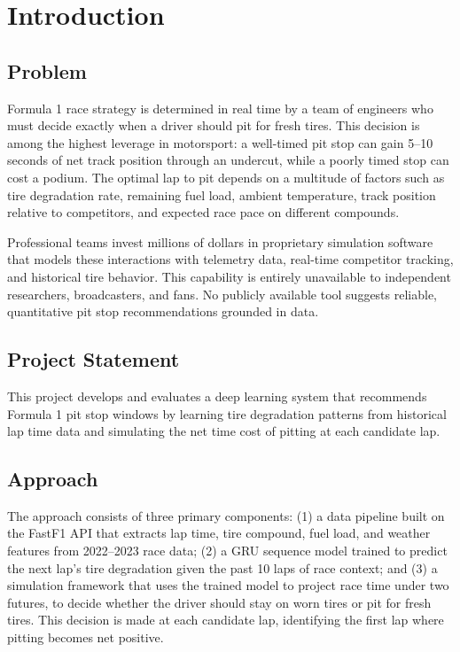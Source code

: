 \section{Introduction}

\subsection{Problem}

Formula 1 race strategy is determined in real time by a team of engineers who must decide exactly when a driver 
should pit for fresh tires. This decision is among the highest leverage in motorsport: a well-timed pit stop can gain 5--10 
seconds of net track position through an undercut, while a poorly timed stop can cost a podium. The optimal lap to pit depends on a 
multitude of factors such as tire degradation rate, remaining fuel load, ambient temperature, track position relative to competitors,
and expected race pace on different compounds.

Professional teams invest millions of dollars in proprietary simulation software that models these interactions with telemetry 
data, real-time competitor tracking, and historical tire behavior. This capability is entirely unavailable to independent researchers,
 broadcasters, and fans. No publicly available tool suggests reliable, quantitative pit stop recommendations grounded in data.

\subsection{Project Statement}

 This project develops and evaluates a deep learning system that recommends Formula 1 pit stop windows by learning tire degradation 
patterns from historical lap time data and simulating the net time cost of pitting at each candidate lap.

\subsection{Approach}

The approach consists of three primary components: (1) a data pipeline built on the FastF1 API \cite{fastf1} that extracts lap time, tire compound, fuel load, 
and weather features from 2022--2023 race data; (2) a GRU sequence model \cite{cho2014} trained to predict the next lap's tire degradation given the 
past 10 laps of race context; and (3) a simulation framework that uses the trained model to project race time under two futures, to decide whether the driver should stay on worn tires 
or pit for fresh tires. This decision is made at each candidate lap, identifying the first lap where pitting becomes net positive.

